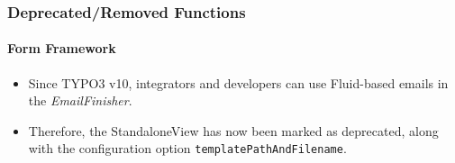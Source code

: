 %

\begin{frame}[fragile]
	\frametitle{Deprecated/Removed Functions}
	\framesubtitle{Form Framework}

	\begin{itemize}
		\item Since TYPO3 v10, integrators and developers can use Fluid-based emails
			in the \textit{EmailFinisher}.
		\item Therefore, the StandaloneView has now been marked as deprecated,
			along with the configuration option \texttt{templatePathAndFilename}.
	\end{itemize}

\end{frame}

